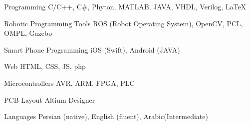 

\begin{cvskills}

  \cvskill
    {Programming} %
    {C/C++, C\#, Phyton, MATLAB, JAVA, VHDL, Verilog, LaTeX} %

  \cvskill
    {Robotic Programming Tools} %
    {ROS (Robot Operating System), OpenCV, PCL, OMPL, Gazebo} %


  \cvskill
    {Smart Phone Programming} %
    {iOS (Swift), Android (JAVA)} %

  \cvskill
    {Web} %
    {HTML, CSS, JS, php} %

  \cvskill
    {Microcontrollers} %
    {AVR, ARM, FPGA, PLC} %

  \cvskill
    {PCB Layout} %
    {Altium Designer} %

  \cvskill
    {Languages} %
    {Persian (native), English (fluent), Arabic(Intermediate)} %

\end{cvskills}
